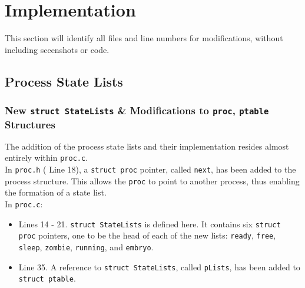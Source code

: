 \documentclass[11pt,letterpaper]{report}
\begin{document}
\newpage

	\section{Implementation}
	This section will identify all files and line numbers for modifications, without including sceenshots or code.
	
	\subsection{Process State Lists}
	
	\subsubsection{New {\tt struct StateLists} \& Modifications to {\tt proc}, {\tt ptable} Structures}
	
	The addition of the process state lists and their implementation resides almost entirely within {\tt proc.c}.\\
	In {\tt proc.h} ({\color{red} Line 18}), a {\tt struct proc} pointer, called {\tt next}, has been added to the process structure. This allows the {\tt proc} to point to another process, thus enabling the formation of a state list.\\
	In {\tt proc.c}:
	\begin{itemize}
		\item {\color{red} Lines 14 - 21}. {\tt struct StateLists} is defined here. It contains six {\tt struct proc} pointers, one to be the head of each of the new lists: {\tt ready}, {\tt free}, {\tt sleep}, {\tt zombie}, {\tt running}, and {\tt embryo}.
		
		\item {\color{red} Line 35}. A reference to {\tt struct StateLists}, called {\tt pLists}, has been added to {\tt struct ptable}.
		
	\end{itemize}
\end{document}
